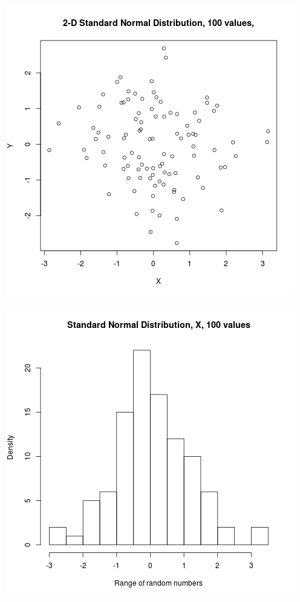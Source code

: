 \documentclass{article}
\begin{document}
\includegraphics{"plot2_1"}
\pagebreak

\includegraphics{"plot2_1_X"}
\pagebreak
\end{document}
